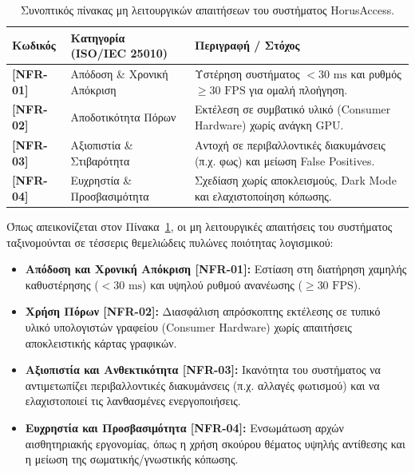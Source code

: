 \documentclass[twoside, a4paper, 11pt]{article}
\newcommand{\textlatin}[1]{\textenglish{#1}}
\begin{document}
\begin{table}[!htbp]
\centering
\begin{tabular}{|l|p{4cm}|p{6.5cm}|}
\hline
\textbf{Κωδικός} & \textbf{Κατηγορία (ISO/IEC 25010)} & \textbf{Περιγραφή / Στόχος} \\ \hline
\textbf{[NFR-01]} & Απόδοση \& Χρονική Απόκριση & Υστέρηση συστήματος $<30\text{ ms}$ και ρυθμός $\ge30\text{ FPS}$ για ομαλή πλοήγηση. \\ \hline
\textbf{[NFR-02]} & Αποδοτικότητα Πόρων & Εκτέλεση σε συμβατικό υλικό (\textlatin{Consumer Hardware}) χωρίς ανάγκη GPU. \\ \hline
\textbf{[NFR-03]} & Αξιοπιστία \& Στιβαρότητα & Αντοχή σε περιβαλλοντικές διακυμάνσεις (π.χ. φως) και μείωση \textlatin{False Positives}. \\ \hline
\textbf{[NFR-04]} & Ευχρηστία \& Προσβασιμότητα & Σχεδίαση χωρίς αποκλεισμούς, \textlatin{Dark Mode} και ελαχιστοποίηση κόπωσης. \\ \hline
\end{tabular}
\caption{Συνοπτικός πίνακας μη λειτουργικών απαιτήσεων του συστήματος \textlatin{HorusAccess}.}
\label{tab:nfr_summary}
\end{table}

Όπως απεικονίζεται στον Πίνακα~\ref{tab:nfr_summary}, οι μη λειτουργικές απαιτήσεις του συστήματος ταξινομούνται σε τέσσερις θεμελιώδεις πυλώνες ποιότητας λογισμικού: 
\begin{itemize}
    \item \textbf{Απόδοση και Χρονική Απόκριση [NFR-01]:} Εστίαση στη διατήρηση χαμηλής καθυστέρησης ($<30\text{ ms}$) και υψηλού ρυθμού ανανέωσης ($ \ge30\text{ FPS}$).
    \item \textbf{Χρήση Πόρων [NFR-02]:} Διασφάλιση απρόσκοπτης εκτέλεσης σε τυπικό υλικό υπολογιστών γραφείου (\textlatin{Consumer Hardware}) χωρίς απαιτήσεις αποκλειστικής κάρτας γραφικών.
    \item \textbf{Αξιοπιστία και Ανθεκτικότητα [NFR-03]:} Ικανότητα του συστήματος να αντιμετωπίζει περιβαλλοντικές διακυμάνσεις (π.χ. αλλαγές φωτισμού) και να ελαχιστοποιεί τις λανθασμένες ενεργοποιήσεις.
    \item \textbf{Ευχρηστία και Προσβασιμότητα [NFR-04]:} Ενσωμάτωση αρχών αισθητηριακής εργονομίας, όπως η χρήση σκούρου θέματος υψηλής αντίθεσης και η μείωση της σωματικής/γνωστικής κόπωσης.
\end{itemize}
\end{document}
